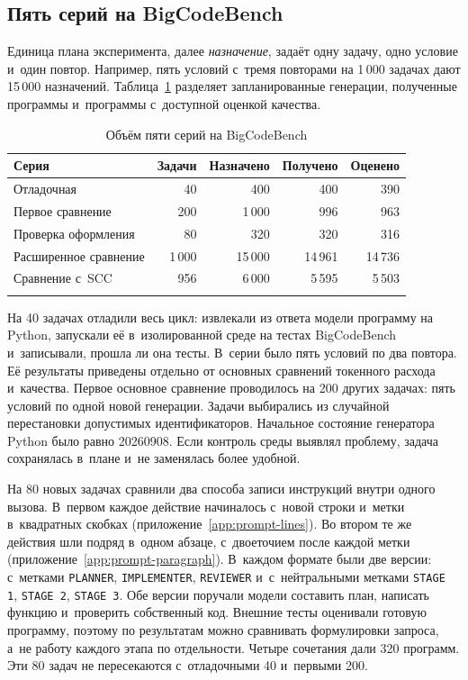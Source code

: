 \subsection{Пять серий на BigCodeBench}
Единица плана эксперимента, далее \emph{назначение}, задаёт одну задачу, одно условие и~один повтор. Например, пять условий с~тремя повторами на 1\,000 задачах дают 15\,000 назначений. Таблица~\ref{tab:series} разделяет запланированные генерации, полученные программы и~программы с~доступной оценкой качества.

\begin{table}[htbp]
\caption{Объём пяти серий на BigCodeBench}
\label{tab:series}
\centering\small\renewcommand{\arraystretch}{1.15}
\begin{tabularx}{\textwidth}{@{}>{\raggedright\arraybackslash}Xrrrr@{}}
\toprule
Серия & Задачи & Назначено & Получено & Оценено \\
\midrule
Отладочная & 40 & 400 & 400 & 390 \\
Первое сравнение & 200 & 1\,000 & 996 & 963 \\
Проверка оформления & 80 & 320 & 320 & 316 \\
Расширенное сравнение & 1\,000 & 15\,000 & 14\,961 & 14\,736 \\
Сравнение с~SCC & 956 & 6\,000 & 5\,595 & 5\,503 \\
\botrule
\end{tabularx}
\end{table}
\FloatBarrier

На 40 задачах отладили весь цикл: извлекали из ответа модели программу на Python, запускали её в~изолированной среде на тестах BigCodeBench и~записывали, прошла ли она тесты. В~серии было пять условий по два повтора. Её результаты приведены отдельно от основных сравнений токенного расхода и~качества. Первое основное сравнение проводилось на 200 других задачах: пять условий по одной новой генерации. Задачи выбирались из случайной перестановки допустимых идентификаторов. Начальное состояние генератора Python было равно 20260908. Если контроль среды выявлял проблему, задача сохранялась в~плане и~не заменялась более удобной.

На 80 новых задачах сравнили два способа записи инструкций внутри одного вызова. В~первом каждое действие начиналось с~новой строки и~метки в~квадратных скобках (приложение~\ref{app:prompt-lines}). Во втором те же действия шли подряд в~одном абзаце, с~двоеточием после каждой метки (приложение~\ref{app:prompt-paragraph}). В~каждом формате были две версии: с~метками \texttt{PLANNER}, \texttt{IMPLEMENTER}, \texttt{REVIEWER} и~с~нейтральными метками \texttt{STAGE 1}, \texttt{STAGE 2}, \texttt{STAGE 3}. Обе версии поручали модели составить план, написать функцию и~проверить собственный код. Внешние тесты оценивали готовую программу, поэтому по результатам можно сравнивать формулировки запроса, а~не работу каждого этапа по отдельности. Четыре сочетания дали 320 программ. Эти 80 задач не пересекаются с~отладочными 40 и~первыми 200.

